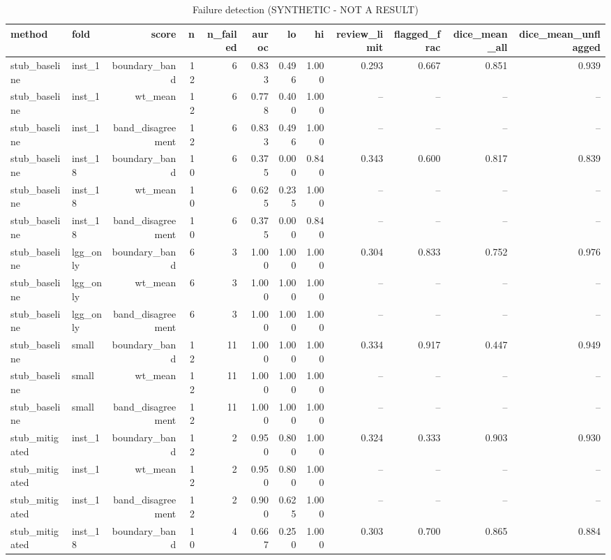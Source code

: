 \begin{table}[t]
\centering
\caption{Failure detection (SYNTHETIC - NOT A RESULT)}
\label{tab:fail}
\begin{tabular}{llrrrrrrrrrr}
\hline
method & fold & score & n & n\_failed & auroc & lo & hi & review\_limit & flagged\_frac & dice\_mean\_all & dice\_mean\_unflagged \\
\hline
stub\_baseline & inst\_1 & boundary\_band & 12 & 6 & 0.833 & 0.496 & 1.000 & 0.293 & 0.667 & 0.851 & 0.939 \\
stub\_baseline & inst\_1 & wt\_mean & 12 & 6 & 0.778 & 0.400 & 1.000 & – & – & – & – \\
stub\_baseline & inst\_1 & band\_disagreement & 12 & 6 & 0.833 & 0.496 & 1.000 & – & – & – & – \\
stub\_baseline & inst\_18 & boundary\_band & 10 & 6 & 0.375 & 0.000 & 0.840 & 0.343 & 0.600 & 0.817 & 0.839 \\
stub\_baseline & inst\_18 & wt\_mean & 10 & 6 & 0.625 & 0.235 & 1.000 & – & – & – & – \\
stub\_baseline & inst\_18 & band\_disagreement & 10 & 6 & 0.375 & 0.000 & 0.840 & – & – & – & – \\
stub\_baseline & lgg\_only & boundary\_band & 6 & 3 & 1.000 & 1.000 & 1.000 & 0.304 & 0.833 & 0.752 & 0.976 \\
stub\_baseline & lgg\_only & wt\_mean & 6 & 3 & 1.000 & 1.000 & 1.000 & – & – & – & – \\
stub\_baseline & lgg\_only & band\_disagreement & 6 & 3 & 1.000 & 1.000 & 1.000 & – & – & – & – \\
stub\_baseline & small & boundary\_band & 12 & 11 & 1.000 & 1.000 & 1.000 & 0.334 & 0.917 & 0.447 & 0.949 \\
stub\_baseline & small & wt\_mean & 12 & 11 & 1.000 & 1.000 & 1.000 & – & – & – & – \\
stub\_baseline & small & band\_disagreement & 12 & 11 & 1.000 & 1.000 & 1.000 & – & – & – & – \\
stub\_mitigated & inst\_1 & boundary\_band & 12 & 2 & 0.950 & 0.800 & 1.000 & 0.324 & 0.333 & 0.903 & 0.930 \\
stub\_mitigated & inst\_1 & wt\_mean & 12 & 2 & 0.950 & 0.800 & 1.000 & – & – & – & – \\
stub\_mitigated & inst\_1 & band\_disagreement & 12 & 2 & 0.900 & 0.625 & 1.000 & – & – & – & – \\
stub\_mitigated & inst\_18 & boundary\_band & 10 & 4 & 0.667 & 0.250 & 1.000 & 0.303 & 0.700 & 0.865 & 0.884 \\

\end{tabular}
\end{table}
